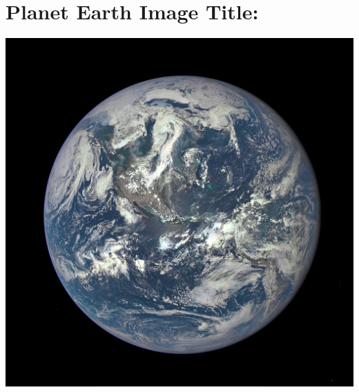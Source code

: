 \documentclass[12pt]{article} %
\begin{document}
\section*{Planet Earth Image Title:}
\begin{flushleft}
\includegraphics{earth.png} %
\end{flushleft}
\end{document}
